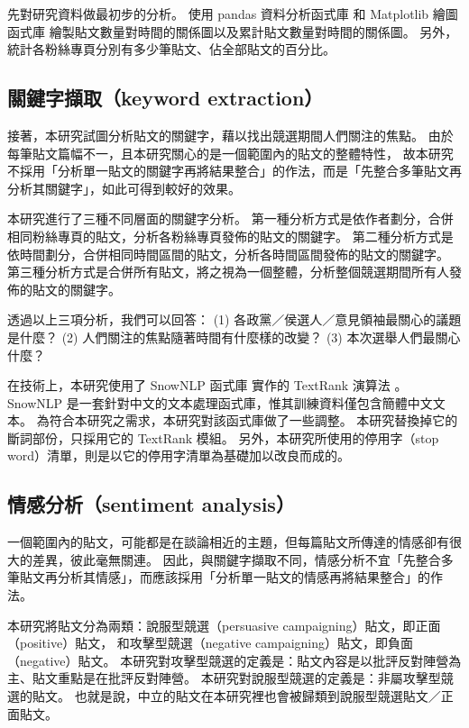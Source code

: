 \documentclass[letterpaper, 10pt, conference]{ieeeconf}   %
\begin{document}
\begin{CJK}{UTF8}{bsmi}
先對研究資料做最初步的分析。
使用 pandas 資料分析函式庫 \cite{c9} 和 Matplotlib 繪圖函式庫 \cite{c10}
繪製貼文數量對時間的關係圖以及累計貼文數量對時間的關係圖。
另外，統計各粉絲專頁分別有多少筆貼文、佔全部貼文的百分比。

\subsection*{關鍵字擷取（keyword extraction）}

接著，本研究試圖分析貼文的關鍵字，藉以找出競選期間人們關注的焦點。
由於每筆貼文篇幅不一，且本研究關心的是一個範圍內的貼文的整體特性，
故本研究不採用「分析單一貼文的關鍵字再將結果整合」的作法，而是「先整合多筆貼文再分析其關鍵字」，如此可得到較好的效果。

本研究進行了三種不同層面的關鍵字分析。
第一種分析方式是依作者劃分，合併相同粉絲專頁的貼文，分析各粉絲專頁發佈的貼文的關鍵字。
第二種分析方式是依時間劃分，合併相同時間區間的貼文，分析各時間區間發佈的貼文的關鍵字。
第三種分析方式是合併所有貼文，將之視為一個整體，分析整個競選期間所有人發佈的貼文的關鍵字。

透過以上三項分析，我們可以回答：
 (1) 各政黨／侯選人／意見領袖最關心的議題是什麼？
 (2) 人們關注的焦點隨著時間有什麼樣的改變？
 (3) 本次選舉人們最關心什麼？

在技術上，本研究使用了 SnowNLP 函式庫 \cite{c11} 實作的 TextRank 演算法 \cite{c12}。
SnowNLP 是一套針對中文的文本處理函式庫，惟其訓練資料僅包含簡體中文文本。
為符合本研究之需求，本研究對該函式庫做了一些調整。
本研究替換掉它的斷詞部份，只採用它的 TextRank 模組。
另外，本研究所使用的停用字（stop word）清單，則是以它的停用字清單為基礎加以改良而成的。

\subsection*{情感分析（sentiment analysis）}

一個範圍內的貼文，可能都是在談論相近的主題，但每篇貼文所傳達的情感卻有很大的差異，彼此毫無關連。
因此，與關鍵字擷取不同，情感分析不宜「先整合多筆貼文再分析其情感」，而應該採用「分析單一貼文的情感再將結果整合」的作法。

本研究將貼文分為兩類：說服型競選（persuasive campaigning）貼文，即正面（positive）貼文，
和攻擊型競選（negative campaigning）貼文，即負面（negative）貼文。
本研究對攻擊型競選的定義是：貼文內容是以批評反對陣營為主、貼文重點是在批評反對陣營。
本研究對說服型競選的定義是：非屬攻擊型競選的貼文。
也就是說，中立的貼文在本研究裡也會被歸類到說服型競選貼文／正面貼文。


\end{CJK}
\end{document}
